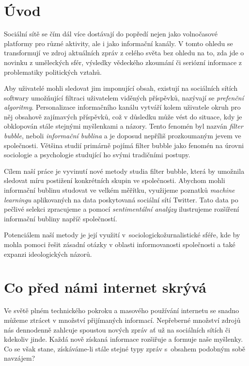 \documentclass[12pt, a4paper]{article}
\numberwithin{equation}{section} 	%
\begin{document}

\newpage
\section*{Úvod}
\noindent Sociální sítě se čím dál více dostávají do popředí nejen jako volnočasové platformy pro různé aktivity, ale i jako informační kanály. V tomto ohledu se transformují ve zdroj aktuálních zpráv z celého světa bez ohledu na to, zda jde o novinku z uměleckých sfér, výsledky vědeckého zkoumání či seriózní informace z problematiky politických vztahů.

Aby uživatelé mohli sledovat jim imponující obsah, existují na sociálních sítích softwary umožňující filtraci uživatelem viděných příspěvků, nazývají se \textit{prefenční algoritmy}. Personalizace informačního kanálu vytváří kolem uživatele okruh pro něj obsahově zajímavých příspěvků, což v důsledku může vést do situace, kdy je obklopován stále stejnými myšlenkami a názory. Tento fenomén byl nazván \textit{filter bubble}, neboli \textit{informační bublina} a je doposud nepříliš prozkoumaným jevem ve společnosti. Většina studií primárně pojímá filter bubble jako fenomén na úrovni sociologie a psychologie studující ho svými tradičními postupy.

Cílem naší práce je vyvinutí nové metody studia filter bubble, která by umožnila sledovat míru postižení konkrétních skupin ve společnosti. Abychom mohli informační bublinu studovat ve velkém měřítku, využijeme poznatků \textit{machine learningu} aplikovaných na data poskytovaná sociální sítí Twitter. Tato data po pečlivé selekci zpracujeme a pomocí \textit{sentimentální analýzy} ilustrujeme rozšíření informační bubliny napříč společností.

Potenciálem naší metody je její využití v sociologickožurnalistické sféře, kde by mohla pomoci řešit zásadní otázky v oblasti informovanosti společnosti a také expanzi ideologických názorů.

\newpage
\section{Co před námi internet skrývá}
\noindent  Ve světě plném technického pokroku a masového používání internetu se snadno můžeme ztrácet v množství přijímaných informací. Nepřeberné množství zdrojů nás dennodenně zahlcuje spoustou nových zpráv ať už na sociálních sítích či kdekoliv jinde. Každá nově získaná informace rozšiřuje a formuje naše myšlenky. Co se však stane, získáváme-li stále stejné typy zpráv s obsahem podobným sobě navzájem?
\end{document}

